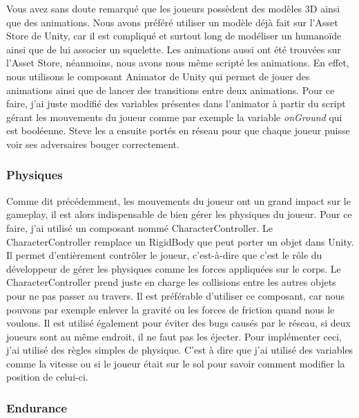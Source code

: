 \documentclass{article}
\begin{document}
Vous avez sans doute remarqué que les joueurs possèdent des modèles 3D ainsi que des animations.
Nous avons préféré utiliser un modèle déjà fait sur l'Asset Store de Unity, car il est compliqué et surtout long de modéliser un humanoïde ainsi que de lui associer un squelette. Les animations aussi ont été trouvées sur l'Asset Store, néanmoins, nous avons nous même scripté les animations. En effet, nous utilisons le composant Animator de Unity qui permet de jouer des animations ainsi que de lancer des transitions entre deux animations. Pour ce faire, j'ai juste modifié des variables présentes dans l'animator à partir du script gérant les mouvements du joueur comme par exemple la variable \emph{onGround} qui est booléenne. Steve les a ensuite portés en réseau pour que chaque joueur puisse voir ses adversaires bouger correctement.


\subsubsection{Physiques}


Comme dit précédemment, les mouvements du joueur ont un grand impact sur le gameplay, il est alors indispensable de bien gérer les physiques du joueur.
Pour ce faire, j'ai utilisé un composant nommé CharacterController. Le CharacterController remplace un RigidBody que peut porter un objet dans Unity. Il permet d'entièrement contrôler le joueur, c'est-à-dire que c'est le rôle du développeur de gérer les physiques comme les forces appliquées sur le corps. Le CharacterController prend juste en charge les collisions entre les autres objets pour ne pas passer au travers. Il est préférable d'utiliser ce composant, car nous pouvons par exemple enlever la gravité ou les forces de friction quand nous le voulons. Il est utilisé également pour éviter des bugs causés par le réseau, si deux joueurs sont au même endroit, il ne faut pas les éjecter.
Pour implémenter ceci, j'ai utilisé des règles simples de physique. C'est à dire que j'ai utilisé des variables comme la vitesse ou si le joueur était sur le sol pour savoir comment modifier la position de celui-ci.


\subsubsection{Endurance}
\end{document}
